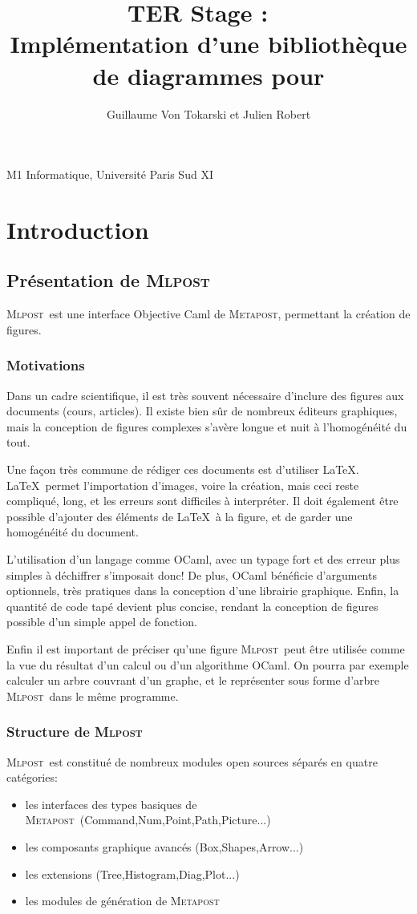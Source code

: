 \documentclass[a4paper,12pt]{article}
\title{\huge{TER Stage : ~\\
  Implémentation d'une bibliothèque de diagrammes pour \mlpost}}
\author{ Guillaume Von Tokarski et Julien Robert}
\newcommand{\mlpost}{\textsc{Mlpost}}
\newcommand{\meta}{\textsc{Metapost}}
\begin{document}
\maketitle

\begin{center}M1 Informatique, Université Paris Sud XI\end{center}
\section{Introduction}

\subsection{Présentation de \mlpost}
\mlpost\ est une interface Objective Caml de \meta, permettant la création de figures. \cite{mlpost}

\subsubsection{Motivations}
Dans un cadre scientifique, il est très souvent nécessaire d'inclure des figures aux documents (cours, articles). Il existe bien sûr de nombreux éditeurs graphiques, mais la conception de figures complexes s'avère longue et nuit à l'homogénéité du tout. 

Une façon très commune de rédiger ces documents est d'utiliser \LaTeX. \LaTeX\ permet l'importation d'images, voire la création, mais ceci reste compliqué, long, et les erreurs sont difficiles à interpréter. Il doit également être possible d'ajouter des éléments de \LaTeX\ à la figure, et de garder une homogénéité du document. 

L'utilisation d'un langage comme OCaml, avec un typage fort et des
erreur plus simples à déchiffrer s'imposait donc! De plus, OCaml
bénéficie d'arguments optionnels, très pratiques dans la conception
d'une librairie graphique. Enfin, la quantité de code tapé devient plus concise, rendant la conception de figures possible d'un simple appel de fonction.

Enfin il est important de préciser qu'une figure \mlpost\ peut être utilisée comme la vue du résultat d'un calcul ou d'un algorithme OCaml. On pourra par exemple calculer un arbre couvrant d'un graphe, et le représenter sous forme d'arbre \mlpost\ dans le même programme.

\subsubsection{Structure de \mlpost}
\mlpost\ est constitué de nombreux modules open sources séparés en quatre catégories:
\begin{itemize}
\item les interfaces des types basiques de \meta\ (Command,Num,Point,Path,Picture...)
\item les composants graphique avancés (Box,Shapes,Arrow...) 
\item les extensions (Tree,Histogram,Diag,Plot...)
\item les modules de génération de \meta
\end{itemize}
\end{document}
